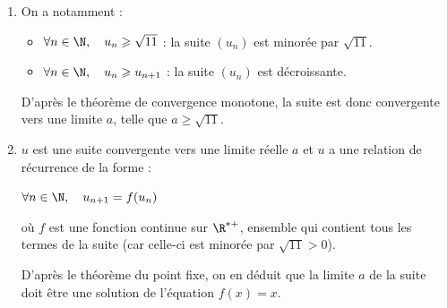 \begin{enumerate}
\emph{Initialisation :} Pour $n = 0$, on a $u_n = 5$ et $u_{n+1} = u_1 = \dfrac{18}{5} = 3,6$ et par ailleurs, on a $\sqrt{11}\approx 3,32$ donc on a bien $u_0\geqslant u_1 \geqslant\sqrt{11}$. L'inégalité est vraie à l'indice 0.

		\emph{Hérédité :} Pour un entier naturel $n$ quelconque fixé, on suppose que l'inégalité est vraie pour l'indice $n$, c'est-à-dire que l'on a : $ u_{n} \geqslant u_{n+1} \geqslant \sqrt{11}$.

		 $\aligned u_{n} \geqslant u_{n+1} \geqslant \sqrt{11}
		 	&\implies f(u_n) \geqslant f(u_{n+1}) \geqslant f\left(\sqrt{11}\right) \qquad \text{car  }f\text{ est croissante sur }\left[\sqrt{11}~;~+\infty \right[\\
		 	&\implies u_{n+1}\geqslant u_{n+2} \geqslant \sqrt{11} \qquad \text{grâce aux éléments de la remarque}\\ \endaligned$

\emph{Conclusion :} On a montré que l'inégalité est vraie pour l'indice 0, et que, pour tout entier naturel $n$ la véracité est héréditaire de l'indice $n$ à l'indice $(n+1)$. En vertu du principe de récurrence, on peut en déduire que :

Pour tout $n$ naturel, on a : $u_{n} \geqslant u_{n+1} \geqslant \sqrt{11}$.

\item On a notamment :
\begin{itemize}
\item $\forall n \in \N, \quad u_n\geqslant \sqrt{11}$ : la suite $(u_n)$ est minorée par $\sqrt{11}$.

\item $\forall n \in \N, \quad u_n\geqslant u_{n+1}$ : la suite $(u_n)$ est décroissante.
\end{itemize}

D'après le théorème de convergence monotone, la suite est donc convergente vers une limite $a$, telle que $a \geqslant\sqrt{11}$.

	\item $u$ est une suite convergente vers une limite réelle $a$ et $u$ a une relation de récurrence de la forme :

$\forall n \in \N, \quad u_{n+1}=f(u_n)$

où $f$ est une fonction continue sur $\R^{*+}$, ensemble qui contient tous les termes de la suite (car celle-ci est minorée par $\sqrt{11}>0$).

D'après le théorème du point fixe, on en déduit que la limite $a$ de la suite doit être une solution de l'équation $f(x) = x$.


\end{enumerate}
